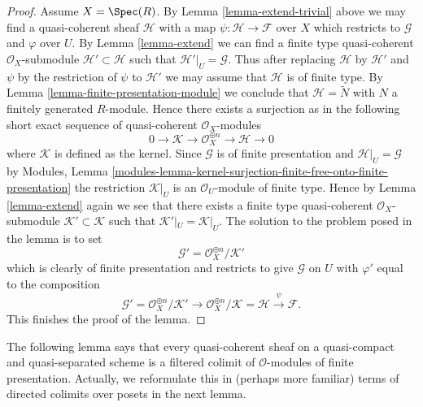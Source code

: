 \begin{proof}
\medskip\noindent
Assume $X = \Spec(R)$.
By Lemma \ref{lemma-extend-trivial} above we may
find a quasi-coherent sheaf $\mathcal{H}$ with
a map $\psi : \mathcal{H} \to \mathcal{F}$ over $X$
which restricts to $\mathcal{G}$ and $\varphi$ over $U$.
By Lemma \ref{lemma-extend} we can find a finite type
quasi-coherent $\mathcal{O}_X$-submodule
$\mathcal{H}' \subset \mathcal{H}$
such that $\mathcal{H}'|_U = \mathcal{G}$. Thus after
replacing $\mathcal{H}$ by $\mathcal{H}'$
and $\psi$ by the restriction of $\psi$ to $\mathcal{H}'$
we may assume that $\mathcal{H}$ is of finite type.
By Lemma \ref{lemma-finite-presentation-module}
we conclude that $\mathcal{H} = \widetilde{N}$ with
$N$ a finitely generated $R$-module. Hence there exists a surjection
as in the following short exact sequence of
quasi-coherent $\mathcal{O}_X$-modules
$$
0 \to \mathcal{K} \to \mathcal{O}_X^{\oplus n} \to \mathcal{H} \to 0
$$
where $\mathcal{K}$ is defined as the kernel.
Since $\mathcal{G}$ is of finite presentation and
$\mathcal{H}|_U = \mathcal{G}$ by
Modules, Lemma
\ref{modules-lemma-kernel-surjection-finite-free-onto-finite-presentation}
the restriction $\mathcal{K}|_U$ is
an $\mathcal{O}_U$-module of finite type. Hence by Lemma \ref{lemma-extend}
again we see that there exists a finite type quasi-coherent
$\mathcal{O}_X$-submodule $\mathcal{K}' \subset \mathcal{K}$ such
that $\mathcal{K}'|_U = \mathcal{K}|_U$. The solution to the problem
posed in the lemma is to set
$$
\mathcal{G}' = \mathcal{O}_X^{\oplus n}/\mathcal{K}'
$$
which is clearly of finite presentation and restricts to give $\mathcal{G}$
on $U$ with $\varphi'$ equal to the composition
$$
\mathcal{G}' = \mathcal{O}_X^{\oplus n}/\mathcal{K}'
\to \mathcal{O}_X^{\oplus n}/\mathcal{K} = \mathcal{H} \xrightarrow{\psi}
\mathcal{F}.
$$
This finishes the proof of the lemma.
\end{proof}

\noindent
The following lemma says that every quasi-coherent sheaf on a quasi-compact
and quasi-separated scheme is a filtered colimit of $\mathcal{O}$-modules
of finite presentation. Actually, we reformulate this in (perhaps more
familiar) terms of directed colimits over posets in the next lemma.

